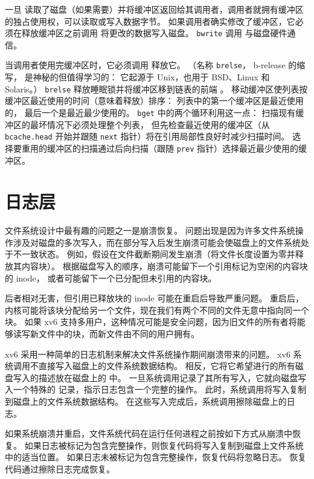 一旦
读取了磁盘（如果需要）并将缓冲区返回给其调用者，调用者就拥有缓冲区的独占使用权，可以读取或写入数据字节。
如果调用者确实修改了缓冲区，它必须在释放缓冲区之前调用
将更改的数据写入磁盘。
\lstinline{bwrite}
调用
与磁盘硬件通信。

当调用者使用完缓冲区时，它必须调用
释放它。
（名称
\lstinline{brelse}，
b-release 的缩写，
是神秘的但值得学习的：
它起源于 Unix，也用于 BSD、Linux 和 Solaris。）
\lstinline{brelse}
释放睡眠锁并将缓冲区移到链表的前端
。
移动缓冲区使列表按缓冲区最近使用的时间（意味着释放）排序：
列表中的第一个缓冲区是最近使用的，
最后一个是最近最少使用的。
\lstinline{bget}
中的两个循环利用这一点：
扫描现有缓冲区的最坏情况下必须处理整个列表，
但先检查最近使用的缓冲区（从
\lstinline{bcache.head}
开始并跟随
\lstinline{next}
指针）将在引用局部性良好时减少扫描时间。
选择要重用的缓冲区的扫描通过后向扫描（跟随
\lstinline{prev}
指针）选择最近最少使用的缓冲区。
\section{日志层}

文件系统设计中最有趣的问题之一是崩溃恢复。
问题出现是因为许多文件系统操作涉及对磁盘的多次写入，而在部分写入后发生崩溃可能会使磁盘上的文件系统处于不一致状态。
例如，假设在文件截断期间发生崩溃（将文件长度设置为零并释放其内容块）。
根据磁盘写入的顺序，崩溃可能留下一个引用标记为空闲的内容块的 inode，
或者可能留下一个已分配但未引用的内容块。

后者相对无害，但引用已释放块的 inode 可能在重启后导致严重问题。
重启后，内核可能将该块分配给另一个文件，现在我们有两个不同的文件无意中指向同一个块。
如果 xv6 支持多用户，这种情况可能是安全问题，因为旧文件的所有者将能够读写新文件中的块，而新文件由不同的用户拥有。

xv6 采用一种简单的日志机制来解决文件系统操作期间崩溃带来的问题。
xv6 系统调用不直接写入磁盘上的文件系统数据结构。
相反，它将它希望进行的所有磁盘写入的描述放在磁盘上的
中。
一旦系统调用记录了其所有写入，它就向磁盘写入一个特殊的
记录，指示日志包含一个完整的操作。
此时，系统调用将写入复制到磁盘上的文件系统数据结构。
在这些写入完成后，系统调用擦除磁盘上的日志。

如果系统崩溃并重启，文件系统代码在运行任何进程之前按如下方式从崩溃中恢复。
如果日志被标记为包含完整操作，则恢复代码将写入复制到磁盘上文件系统中的适当位置。
如果日志未被标记为包含完整操作，恢复代码将忽略日志。
恢复代码通过擦除日志完成恢复。

